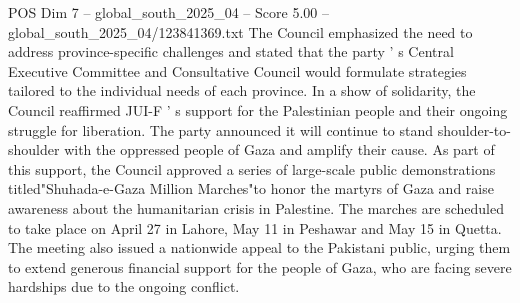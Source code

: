 \begin{textsample}{POS Dim 7 – global\_south\_2025\_04 – Score 5.00 – global\_south\_2025\_04/123841369.txt}
The Council emphasized the need to address province-specific challenges and stated that the party ' s Central Executive Committee and Consultative Council would formulate strategies tailored to the individual needs of each province.
In a show of solidarity, the Council reaffirmed JUI-F ' s support for the Palestinian people and their ongoing struggle for liberation.
The party announced it will continue to stand shoulder-to-shoulder with the oppressed people of Gaza and amplify their cause.
As part of this support, the Council approved a series of large-scale public demonstrations titled"Shuhada-e-Gaza Million Marches"to honor the martyrs of Gaza and raise awareness about the humanitarian crisis in Palestine.
The marches are scheduled to take place on April 27 in Lahore, May 11 in Peshawar and May 15 in Quetta.
The meeting also issued a nationwide appeal to the Pakistani public, urging them to extend generous financial support for the people of Gaza, who are facing severe hardships due to the ongoing conflict.

\end{textsample}
